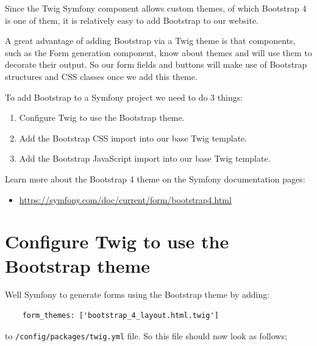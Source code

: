 \documentclass[a4paperpaper,openright]{book}
\newenvironment{Shaded}{}{}
\newcommand{\AttributeTok}[1]{\textcolor[rgb]{0.49,0.56,0.16}{#1}}
\newcommand{\FunctionTok}[1]{\textcolor[rgb]{0.02,0.16,0.49}{#1}}
\newcommand{\KeywordTok}[1]{\textcolor[rgb]{0.00,0.44,0.13}{\textbf{#1}}}
\newcommand{\StringTok}[1]{\textcolor[rgb]{0.25,0.44,0.63}{#1}}
\providecommand{\tightlist}{%
  \setlength{\itemsep}{0pt}\setlength{\parskip}{0pt}}
\begin{document}
Since the Twig Symfony component allows custom themes, of which
Bootstrap 4 is one of them, it is relatively easy to add Bootstrap to
our website.

A great advantage of adding Bootstrap via a Twig theme is that
components, such as the Form generation component, know about themes and
will use them to decorate their output. So our form fields and buttons
will make use of Bootstrap structures and CSS classes once we add this
theme.

To add Bootstrap to a Symfony project we need to do 3 things:

\begin{enumerate}
\def\labelenumi{\arabic{enumi}.}
\item
  Configure Twig to use the Bootstrap theme.
\item
  Add the Bootstrap CSS import into our base Twig template.
\item
  Add the Bootstrap JavaScript import into our base Twig template.
\end{enumerate}

Learn more about the Bootstrap 4 theme on the Symfony documentation
pages:

\begin{itemize}
\tightlist
\item
  \url{https://symfony.com/doc/current/form/bootstrap4.html}
\end{itemize}

\hypertarget{configure-twig-to-use-the-bootstrap-theme}{%
\section{Configure Twig to use the Bootstrap
theme}\label{configure-twig-to-use-the-bootstrap-theme}}

Well Symfony to generate forms using the Bootstrap theme by adding:

\begin{verbatim}
    form_themes: ['bootstrap_4_layout.html.twig']
\end{verbatim}

to \texttt{/config/packages/twig.yml} file. So this file should now look
as follows;

\begin{Shaded}
\end{Shaded}
\end{document}
